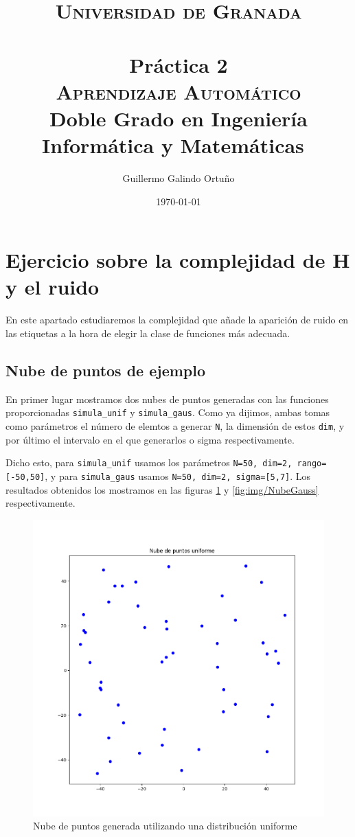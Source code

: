 \documentclass[
  a4paper,
  spanish,
  12pt,
  enlargefirstpage,
]{scrartcl}
\title{
\normalfont \normalsize
\textsc{Universidad de Granada}\\ [25pt] %
\horrule{0.5pt}\\ [0.4cm] %
{\sffamily\bfseries\Large Práctica 2}\\ [6pt] %
\textsf{\textsc{Aprendizaje Automático}\\ Doble Grado en Ingeniería Informática y Matemáticas}\
\horrule{2pt}\\ [0.5cm] %
}
\author{Guillermo Galindo Ortuño} %
\date{\normalsize\today} %
\begin{document}
\maketitle %
\section{Ejercicio sobre la complejidad de H y el ruido}%
\label{sec:ejercicio_sobre_la_complejidad_de_h_y_el_ruido}
En este apartado estudiaremos la complejidad que añade la aparición de ruido en las etiquetas a la hora de elegir la clase de funciones más adecuada.

\subsection{Nube de puntos de ejemplo}%
\label{sub:nube_de_puntos_de_ejemplo}

En primer lugar mostramos dos nubes de puntos generadas con las funciones proporcionadas \texttt{simula\_unif} y \texttt{simula\_gaus}. Como ya dijimos, ambas tomas como parámetros el número de elemtos a generar \texttt{N}, la dimensión de estos \texttt{dim}, y por último el intervalo en el que generarlos o sigma respectivamente.

Dicho esto, para \texttt{simula\_unif} usamos los parámetros \texttt{N=50, dim=2, rango=[-50,50]}, y para \texttt{simula\_gaus} usamos \texttt{N=50, dim=2, sigma=[5,7]}. Los resultados obtenidos los mostramos en las figuras \ref{fig:img/NubeUniforme} y \ref{fig:img/NubeGauss} respectivamente.

\begin{figure}[h]
    \centering
    \includegraphics[width=0.6\linewidth]{img/NubeUniforme.png}
    \caption{Nube de puntos generada utilizando una distribución uniforme}%
    \label{fig:img/NubeUniforme}
\end{figure}
\end{document}
